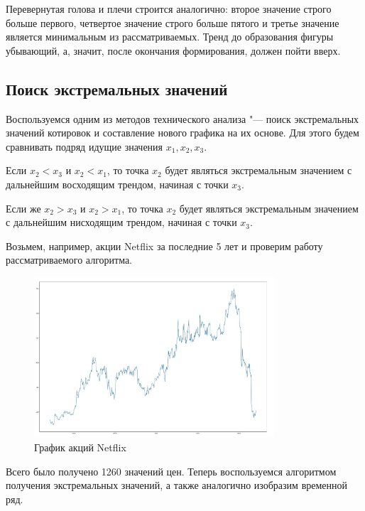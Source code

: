 \documentclass[bachelor, och, coursework]{SCWorks}
\begin{document}
    Перевернутая голова и плечи строится аналогично: второе значение строго
    больше первого, четвертое значение строго больше пятого и третье значение
    является минимальным из рассматриваемых. Тренд до образования фигуры
    убывающий, а, значит, после окончания формирования, должен пойти вверх.

    \subsection{Поиск экстремальных значений}
    Воспользуемся одним из методов технического анализа "--- поиск экстремальных
    значений котировок и составление нового графика на их основе. Для этого
    будем сравнивать подряд идущие значения $x_1, x_2, x_3$.

    Если $x_2 < x_3$ и $x_2 < x_1$, то точка $x_2$ будет являться экстремальным
    значением с дальнейшим восходящим трендом, начиная с точки $x_3$.

    Если же $x_2 > x_3$ и $x_2 > x_1$, то точка $x_2$ будет являться экстремальным
    значением с дальнейшим нисходящим трендом, начиная с точки $x_3$.

    Возьмем, например, акции Netflix за последние 5 лет и проверим работу
    рассматриваемого алгоритма.
    
    \begin{figure}[H]
        \centering
        \includegraphics[width=0.8\textwidth]{pic/NetflixInitial.jpg}
        \caption{График акций Netflix}
    \end{figure}

    Всего было получено 1260 значений цен. Теперь воспользуемся алгоритмом
    получения экстремальных значений, а также аналогично изобразим временной
    ряд.
    
\end{document}
